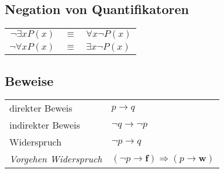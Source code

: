 \subsection{Negation von Quantifikatoren}
\begin{tabular}{rcl}
	$\neg \exists x P(x)$ & $\equiv$ & $\forall x \neg P(x)$ \\
	$\neg \forall x P(x)$ & $\equiv$ & $\exists x \neg P(x)$ \\
\end{tabular}

\subsection{Beweise}
\begin{tabular}{ll}
	direkter Beweis & $p \rightarrow q$ \\ 
	indirekter Beweis & $\neg q \rightarrow \neg p$ \\ 
	Widerspruch & $\neg p \rightarrow q$ \\
	\textit{Vorgehen Widerspruch}& $(\neg p \rightarrow \textbf{f}) \Rightarrow (p \rightarrow \textbf{w})$ \\
\end{tabular} 

